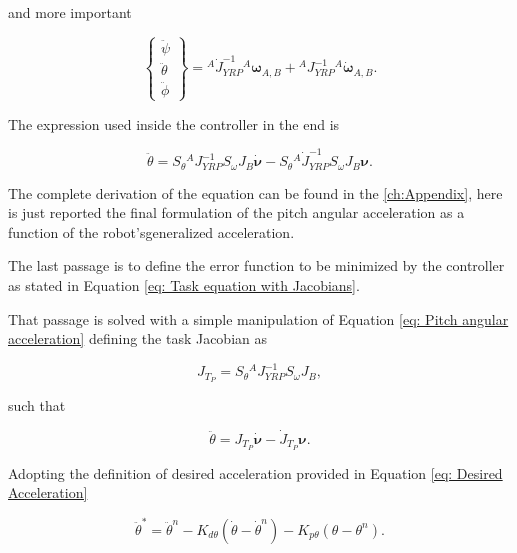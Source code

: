 and more important

\begin{equation}
    \begin{Bmatrix}
        \ddot{\psi} \\
        \ddot{\theta} \\
        \ddot{\phi} 
    \end{Bmatrix} = {}^{A}\dot{J}^{-1}_{YRP} {}^{A} \bm{\omega}_{A,B} + {}^{A}J^{-1}_{YRP} {}^{A} \bm{\dot{\omega}}_{A,B}.
    \label{eq: YRP accelerations}
\end{equation}

The expression used inside the controller in the end is

\begin{equation}
    \ddot{\theta} = S_{\theta}{}^{A}J^{-1}_{YRP}S_{\omega}J_{B}\dot{\bm{\nu}} - S_{\theta}{}^{A}\dot{J}^{-1}_{YRP}S_{\omega}J_{B}\bm{\nu}
    \label{eq: Pitch angular acceleration}.
\end{equation}

The complete derivation of the equation can be found in the \cref{ch:Appendix}, here is just reported the final formulation of the pitch angular acceleration as a function of the robot'sgeneralized acceleration.

The last passage is to define the error function to be minimized by the controller as stated in Equation \eqref{eq: Task equation with Jacobians}.

That passage is solved with a simple manipulation of Equation \eqref{eq: Pitch angular acceleration}
defining the task Jacobian as

\begin{equation}
    J_{T_P} = S_{\theta}{}^{A}J^{-1}_{YRP}S_{\omega}J_{B},
    \label{eq: Pitch Task Jacobian}
\end{equation}

such that 

\begin{equation*}
     \ddot{\theta} = J_{T_P}{\dot{\bm{\nu}}} - \dot{J}_{T_P}\bm{\nu}.
\end{equation*}

Adopting the definition of desired acceleration provided in Equation \eqref{eq: Desired Acceleration}

\begin{equation}
    \ddot{\theta}^{*} = \ddot{\theta}^{n} -K_{d\theta}(\dot{\theta}-\dot{\theta}^{n}) -K_{p\theta}(\theta - \theta^{n}).
    \label{eq: Pitch Desired Acceleration}
\end{equation}


